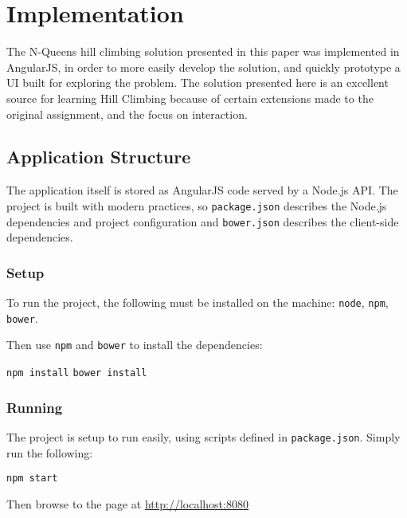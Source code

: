 \section{Implementation}
\label{section:implementation}
The N-Queens hill climbing solution presented in this paper was implemented in AngularJS, in order to more easily
develop the solution, and quickly prototype a UI built for exploring the problem. The solution presented here is an
excellent source for learning Hill Climbing because of certain extensions made to the original assignment, and the
focus on interaction.

\subsection{Application Structure}
The application itself is stored as AngularJS code served by a Node.js API. The project is built with modern practices,
so \texttt{package.json} describes the Node.js dependencies and project configuration and \texttt{bower.json} describes
the client-side dependencies.

\subsubsection{Setup}
To run the project, the following must be installed on the machine:
\texttt{node}\cite{node}, \texttt{npm}\cite{npm}, \texttt{bower}\cite{bower}.

Then use \texttt{npm} and \texttt{bower} to install the dependencies:

\texttt{npm install}
\texttt{bower install}

\subsubsection{Running}
The project is setup to run easily, using scripts defined in \texttt{package.json}. Simply run the following:

\texttt{npm start}

Then browse to the page at \url{http://localhost:8080}